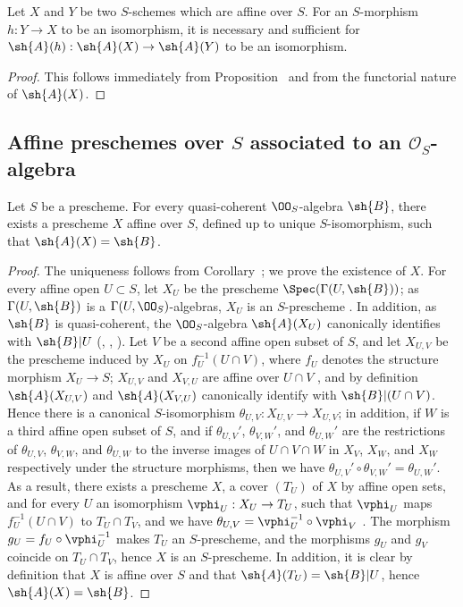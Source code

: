 \begin{cor}[1.2.8]
\label{2.1.2.8}
Let $X$ and $Y$ be two $S$-schemes which are affine over $S$.
For an $S$-morphism $h:Y\to X$ to be an isomorphism, it is necessary and sufficient for $\sh{A}(h):\sh{A}(X)\to\sh{A}(Y)$ to be an isomorphism.
\end{cor}

\begin{proof}
\label{proof-2.1.2.8}
This follows immediately from Proposition~ and from the functorial nature of $\sh{A}(X)$.
\end{proof}

\subsection{Affine preschemes over $S$ associated to an $\mathcal{O}_S$-algebra}
\label{subsection:affine-preschemes-associated-to-algebra}

\begin{prop}[1.3.1]
\label{2.1.3.1}
Let $S$ be a prescheme.
For every quasi-coherent $\OO_S$-algebra $\sh{B}$, there exists a prescheme $X$ affine over $S$, defined up to unique $S$-isomorphism, such that $\sh{A}(X)=\sh{B}$.
\end{prop}

\begin{proof}
\label{proof-2.1.3.1}
The uniqueness follows from Corollary~; we prove the existence of $X$.
For every affine open $U\subset S$, let $X_U$ be the prescheme $\Spec(\Gamma(U,\sh{B}))$; as $\Gamma(U,\sh{B})$ is a $\Gamma(U,\OO_S)$-algebras, $X_U$ is an $S$-prescheme .
In addition, as $\sh{B}$ is quasi-coherent, the $\OO_S$-algebra $\sh{A}(X_U)$ canonically identifies with $\sh{B}|U$ (, , ).
Let $V$ be a second affine open subset of $S$, and let $X_{U,V}$ be the prescheme induced by $X_U$ on $f_U^{-1}(U\cap V)$, where $f_U$ denotes the structure morphism $X_U\to S$; $X_{U,V}$ and $X_{V,U}$ are affine over $U\cap V$ , and by definition $\sh{A}(X_{U,V})$ and $\sh{A}(X_{V,U})$ canonically identify with $\sh{B}|(U\cap V)$.
Hence there is  a canonical $S$-isomorphism $\theta_{U,V}:X_{U,V}\to X_{U,V}$; in addition, if $W$ is a third affine open subset of $S$, and if $\theta_{U,V}'$, $\theta_{V,W}'$, and $\theta_{U,W}'$ are the restrictions of $\theta_{U,V}$, $\theta_{V,W}$, and $\theta_{U,W}$ to the inverse images of $U\cap V\cap W$ in $X_V$, $X_W$, and $X_W$ respectively under the structure morphisms, then we have $\theta_{U,V}'\circ\theta_{V,W}'=\theta_{U,W}'$.
As a result, there exists a prescheme $X$, a cover $(T_U)$ of $X$ by affine open sets, and for every $U$ an isomorphism $\vphi_U:X_U\to T_U$, such that $\vphi_U$ maps $f_U^{-1}(U\cap V)$ to $T_U\cap T_V$, and we have $\theta_{U,V}=\vphi_U^{-1}\circ\vphi_V$ .
The morphism $g_U=f_U\circ\vphi_U^{-1}$ makes $T_U$ an $S$-prescheme, and the morphisms $g_U$ and $g_V$ coincide on $T_U\cap T_V$, hence $X$ is an $S$-prescheme.
In addition, it is clear by definition that $X$ is affine over $S$ and that $\sh{A}(T_U)=\sh{B}|U$, hence $\sh{A}(X)=\sh{B}$.
\end{proof}

